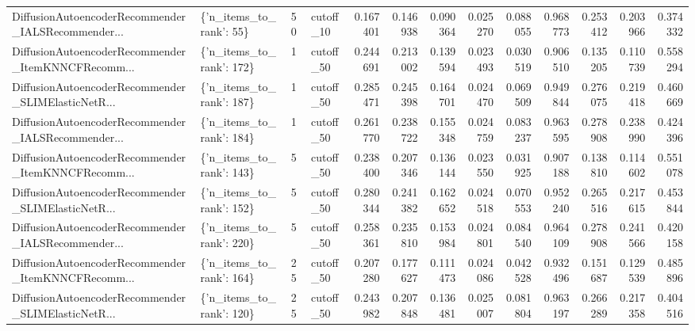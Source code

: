 \begin{tabular}{llllrrrrrrrrr}
DiffusionAutoencoderRecommender\_IALSRecommender... &  \{'n\_items\_to\_rank': 55\} &       50 & cutoff\_10 & 0.167401 &   0.146938 & 0.090364 & 0.025270 &        0.088055 &                   0.968773 &       0.253412 &           0.203966 &            0.374332 \\
DiffusionAutoencoderRecommender\_ItemKNNCFRecomm... & \{'n\_items\_to\_rank': 172\} &        1 & cutoff\_50 & 0.244691 &   0.213002 & 0.139594 & 0.023493 &        0.030519 &                   0.906510 &       0.135205 &           0.110739 &            0.558294 \\
DiffusionAutoencoderRecommender\_SLIMElasticNetR... & \{'n\_items\_to\_rank': 187\} &        1 & cutoff\_50 & 0.285471 &   0.245398 & 0.164701 & 0.024470 &        0.069509 &                   0.949844 &       0.276075 &           0.219418 &            0.460669 \\
DiffusionAutoencoderRecommender\_IALSRecommender... & \{'n\_items\_to\_rank': 184\} &        1 & cutoff\_50 & 0.261770 &   0.238722 & 0.155348 & 0.024759 &        0.083237 &                   0.963595 &       0.278908 &           0.238990 &            0.424396 \\
DiffusionAutoencoderRecommender\_ItemKNNCFRecomm... & \{'n\_items\_to\_rank': 143\} &        5 & cutoff\_50 & 0.238400 &   0.207346 & 0.136144 & 0.023550 &        0.031925 &                   0.907188 &       0.138810 &           0.114602 &            0.551078 \\
DiffusionAutoencoderRecommender\_SLIMElasticNetR... & \{'n\_items\_to\_rank': 152\} &        5 & cutoff\_50 & 0.280344 &   0.241382 & 0.162652 & 0.024518 &        0.070553 &                   0.952240 &       0.265516 &           0.217615 &            0.453844 \\
DiffusionAutoencoderRecommender\_IALSRecommender... & \{'n\_items\_to\_rank': 220\} &        5 & cutoff\_50 & 0.258361 &   0.235810 & 0.153984 & 0.024801 &        0.084540 &                   0.964109 &       0.278908 &           0.241566 &            0.420158 \\
DiffusionAutoencoderRecommender\_ItemKNNCFRecomm... & \{'n\_items\_to\_rank': 164\} &       25 & cutoff\_50 & 0.207280 &   0.177627 & 0.111473 & 0.024086 &        0.042528 &                   0.932496 &       0.151687 &           0.129539 &            0.485896 \\
DiffusionAutoencoderRecommender\_SLIMElasticNetR... & \{'n\_items\_to\_rank': 120\} &       25 & cutoff\_50 & 0.243982 &   0.207848 & 0.136481 & 0.025007 &        0.081804 &                   0.963197 &       0.266289 &           0.217358 &            0.404516 \\

\end{tabular}

